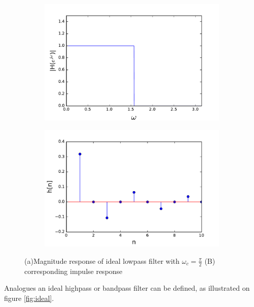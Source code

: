 \begin{figure}[H]
\begin{subfigure}[b]{0.50\textwidth}
        \centering
\includegraphics[scale=0.45]{figures/filter_teori/ideal_low2.pdf}
\caption{}
\end{subfigure}
\begin{subfigure}[b]{0.50\textwidth}
        \centering  
\includegraphics[scale=0.45]{figures/filter_teori/ideal_low1.pdf}
\caption{}
 \end{subfigure}
\caption{ (a)Magnitude response of ideal lowpass filter with $\omega_c = \frac{\pi}{2}$ (B) corresponding impulse response}
\label{fig:ideal_low}
\end{figure}


Analogues an ideal highpass or bandpass filter can be defined, as illustrated on figure \ref{fig:ideal}.\\ 

